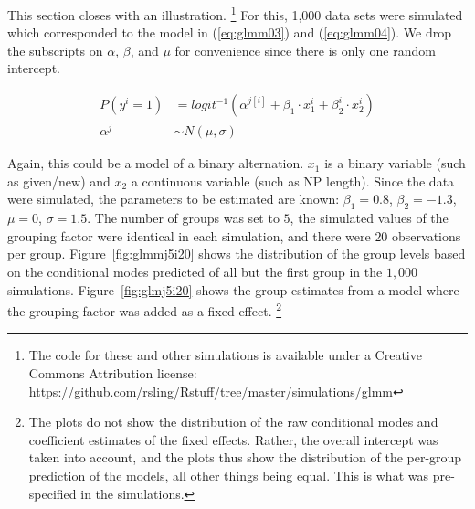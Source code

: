 \documentclass[a4paper,12pt]{article}
\begin{document}
This section closes with an illustration.%
\footnote{The code for these and other simulations is available under a Creative Commons Attribution license: \url{https://github.com/rsling/Rstuff/tree/master/simulations/glmm}}
For this, 1,000 data sets were simulated which corresponded to the model in (\ref{eq:glmm03}) and (\ref{eq:glmm04}).
We drop the subscripts on $\alpha$, $\beta$, and $\mu$ for convenience since there is only one random intercept.

\begin{align}
  P(y^i=1) & =logit^{-1}(\alpha^{j[i]}+\beta_1\cdot x_1^i+\beta_2^i\cdot x_2^i)
  \label{eq:glmm03}\\
  \alpha^j & \sim N(\mu, \sigma)\label{eq:glmm04}
\end{align}

Again, this could be a model of a binary alternation.
$x_1$ is a binary variable (such as given\slash new) and $x_2$ a continuous variable (such as NP length).
Since the data were simulated, the parameters to be estimated are known: $\beta_1=0.8$, $\beta_2=-1.3$, $\mu=0$, $\sigma=1.5$.
The number of groups was set to $5$, the simulated values of the grouping factor were identical in each simulation, and there were $20$ observations per group.
Figure~\ref{fig:glmmj5i20} shows the distribution of the group levels based on the conditional modes predicted of all but the first group in the $1,000$ simulations.
Figure~\ref{fig:glmj5i20} shows the group estimates from a model where the grouping factor was added as a fixed effect.%
\footnote{The plots do not show the distribution of the raw conditional modes and coefficient estimates of the fixed effects.
Rather, the overall intercept was taken into account, and the plots thus show the distribution of the per-group prediction of the models, all other things being equal.
This is what was pre-specified in the simulations.}
\end{document}
